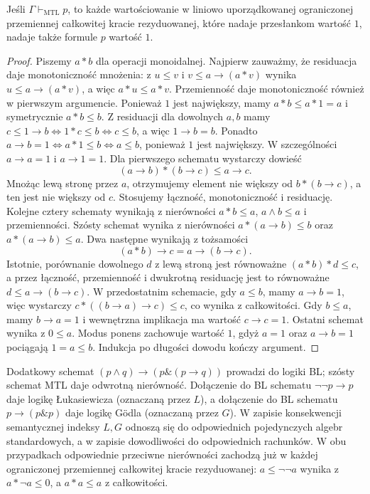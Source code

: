 \begin{twierdzenie}\label{thm:lst-fuzzy-mtl-soundness}
Jeśli $\Gamma\vdash_{\mathrm{MTL}}p$, to każde wartościowanie w liniowo
uporządkowanej ograniczonej przemiennej całkowitej kracie
rezyduowanej, które nadaje przesłankom wartość $1$, nadaje także
formule $p$ wartość $1$.
\end{twierdzenie}
\begin{proof}
Piszemy $a*b$ dla operacji monoidalnej. Najpierw zauważmy,
że residuacja daje monotoniczność mnożenia: z $u\leq v$
i $v\leq a\to(a*v)$ wynika $u\leq a\to(a*v)$,
a więc $a*u\leq a*v$. Przemienność daje monotoniczność
również w pierwszym argumencie. Ponieważ $1$ jest największy,
mamy $a*b\leq a*1=a$ i symetrycznie $a*b\leq b$.
Z residuacji dla dowolnych $a,b$ mamy
$c\leq 1\to b\iff 1*c\leq b\iff c\leq b$,
a więc $1\to b=b$. Ponadto
$a\to b=1\iff a*1\leq b\iff a\leq b$,
ponieważ $1$ jest największy. W szczególności
$a\to a=1$ i $a\to1=1$.
Dla pierwszego schematu wystarczy dowieść
\[
(a\to b)*(b\to c)\leq a\to c.
\]
Mnożąc lewą stronę przez $a$, otrzymujemy element nie większy od
$b*(b\to c)$, a ten jest nie większy od $c$. Stosujemy łączność,
monotoniczność i residuację. Kolejne cztery schematy wynikają
z nierówności $a*b\leq a$, $a\wedge b\leq a$ i przemienności.
Szósty schemat wynika z nierówności $a*(a\to b)\leq b$ oraz
$a*(a\to b)\leq a$. Dwa następne wynikają z tożsamości
\[
 (a*b)\to c=a\to(b\to c).
\]
Istotnie, porównanie dowolnego $d$ z lewą stroną jest równoważne
$(a*b)*d\leq c$, a przez łączność, przemienność i dwukrotną
residuację jest to równoważne $d\leq a\to(b\to c)$.
W przedostatnim schemacie, gdy $a\leq b$, mamy $a\to b=1$,
więc wystarczy $c*((b\to a)\to c)\leq c$, co wynika z całkowitości.
Gdy $b\leq a$, mamy $b\to a=1$ i wewnętrzna implikacja ma wartość
$c\to c=1$. Ostatni schemat wynika z $0\leq a$.
Modus ponens zachowuje wartość $1$, gdyż $a=1$ oraz $a\to b=1$
pociągają $1=a\leq b$. Indukcja po długości dowodu kończy argument.
\end{proof}
Dodatkowy schemat $(p\wedge q)\to(p\mathbin{\&}(p\to q))$
prowadzi do logiki BL; szósty schemat MTL daje odwrotną nierówność.
Dołączenie do BL schematu $\neg\neg p\to p$ daje logikę
Łukasiewicza (oznaczaną przez $L$), a dołączenie do BL
schematu $p\to(p\mathbin{\&}p)$ daje logikę Gödla
(oznaczaną przez $G$). W zapisie konsekwencji semantycznej
indeksy $L,G$ odnoszą się do odpowiednich pojedynczych
algebr standardowych, a w zapisie dowodliwości do
odpowiednich rachunków. W obu przypadkach odpowiednie przeciwne nierówności
zachodzą już w każdej ograniczonej przemiennej całkowitej kracie
rezyduowanej: $a\leq\neg\neg a$ wynika z $a*\neg a\leq0$,
a $a*a\leq a$ z całkowitości.


